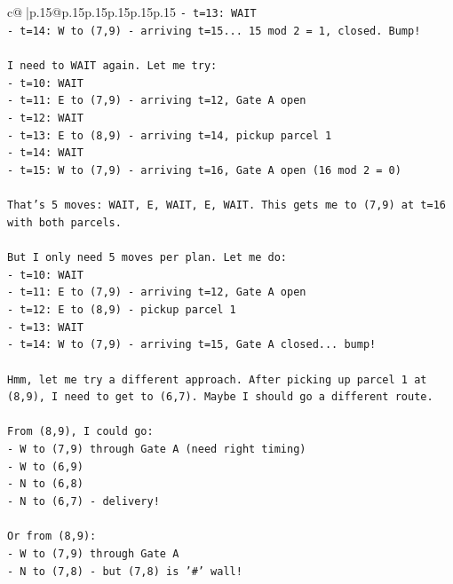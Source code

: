 \documentclass{article}
\begin{document}
{\begin{supertabular}{c@{$\;$}|p{.15\linewidth}@{}p{.15\linewidth}p{.15\linewidth}p{.15\linewidth}p{.15\linewidth}p{.15\linewidth}}
{{{\texttt{{-} t=13: WAIT} \\
\texttt{{-} t=14: W to (7,9) {-} arriving t=15... 15 mod 2 = 1, closed. Bump!} \\
\\ 
\texttt{I need to WAIT again. Let me try:} \\
\texttt{{-} t=10: WAIT} \\
\texttt{{-} t=11: E to (7,9) {-} arriving t=12, Gate A open} \\
\texttt{{-} t=12: WAIT} \\
\texttt{{-} t=13: E to (8,9) {-} arriving t=14, pickup parcel 1} \\
\texttt{{-} t=14: WAIT} \\
\texttt{{-} t=15: W to (7,9) {-} arriving t=16, Gate A open (16 mod 2 = 0)} \\
\\ 
\texttt{That's 5 moves: WAIT, E, WAIT, E, WAIT. This gets me to (7,9) at t=16 with both parcels.} \\
\\ 
\texttt{But I only need 5 moves per plan. Let me do:} \\
\texttt{{-} t=10: WAIT} \\
\texttt{{-} t=11: E to (7,9) {-} arriving t=12, Gate A open} \\
\texttt{{-} t=12: E to (8,9) {-} pickup parcel 1} \\
\texttt{{-} t=13: WAIT} \\
\texttt{{-} t=14: W to (7,9) {-} arriving t=15, Gate A closed... bump!} \\
\\ 
\texttt{Hmm, let me try a different approach. After picking up parcel 1 at (8,9), I need to get to (6,7). Maybe I should go a different route.} \\
\\ 
\texttt{From (8,9), I could go:} \\
\texttt{{-} W to (7,9) through Gate A (need right timing)} \\
\texttt{{-} W to (6,9)} \\
\texttt{{-} N to (6,8)} \\
\texttt{{-} N to (6,7) {-} delivery!} \\
\\ 
\texttt{Or from (8,9):} \\
\texttt{{-} W to (7,9) through Gate A} \\
\texttt{{-} N to (7,8) {-} but (7,8) is '\#' wall!} \\
\\ 
}}}
\end{supertabular}}
\end{document}
